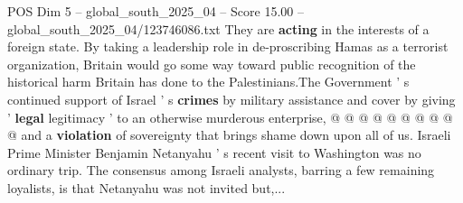 \begin{textsample}{POS Dim 5 – global\_south\_2025\_04 – Score 15.00 – global\_south\_2025\_04/123746086.txt}
They are \textbf{acting} in the interests of a foreign state.
By taking a leadership role in de-proscribing Hamas as a terrorist organization, Britain would go some way toward public recognition of the historical harm Britain has done to the Palestinians.The Government ' s continued support of Israel ' s \textbf{crimes} by military assistance and cover by giving ' \textbf{legal} legitimacy ' to an otherwise murderous enterprise, @ @ @ @ @ @ @ @ @ @ and a \textbf{violation} of sovereignty that brings shame down upon all of us.
Israeli Prime Minister Benjamin Netanyahu ' s recent visit to Washington was no ordinary trip.
The consensus among Israeli analysts, barring a few remaining loyalists, is that Netanyahu was not invited but,...

\end{textsample}
